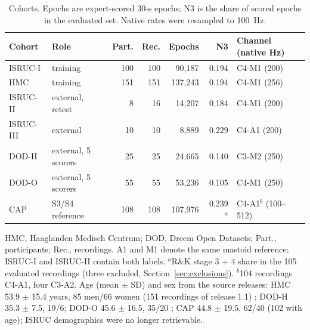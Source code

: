\begin{table}[!t]
\caption{Cohorts. Epochs are expert-scored 30-s epochs; N3 is the share of scored epochs in the evaluated set. Native rates were resampled to 100~Hz.}
\label{tab:cohorts}
\centering
\setlength{\tabcolsep}{3pt}
\footnotesize
\begin{tabular}{@{}llrrrrl@{}}
\toprule
Cohort & Role & Part. & Rec. & Epochs & N3 & Channel (native Hz) \\
\midrule
ISRUC-I & training & 100 & 100 & 90,187 & 0.194 & C4-M1 (200) \\ %
HMC & training & 151 & 151 & 137,243 & 0.194 & C4-M1 (256) \\
ISRUC-II & external, retest & 8 & 16 & 14,207 & 0.184 & C4-M1 (200) \\
ISRUC-III & external & 10 & 10 & 8,889 & 0.229 & C4-A1 (200) \\
DOD-H & external, 5 scorers & 25 & 25 & 24,665 & 0.140 & C3-M2 (250) \\
DOD-O & external, 5 scorers & 55 & 55 & 53,236 & 0.105 & C4-M1 (250) \\
CAP & S3/S4 reference & 108 & 108 & 107,976 & 0.239$^{a}$ & C4-A1$^{b}$ (100--512) \\
\bottomrule
\end{tabular}
\vspace{2pt}

\raggedright\scriptsize HMC, Haaglanden Medisch Centrum; DOD, Dreem Open Datasets; Part., participants; Rec., recordings. A1 and M1 denote the same mastoid reference; ISRUC-I and ISRUC-II contain both labels. $^{a}$R\&K stage 3 + 4 share in the 105 evaluated recordings (three excluded, Section~\ref{sec:exclusions}). $^{b}$104 recordings C4-A1, four C3-A2. Age (mean $\pm$ SD) and sex from the source releases: HMC 53.9 $\pm$ 15.4 years, 85 men/66 women (151 recordings of release 1.1) \cite{alvarez2022hmcdb}; DOD-H 35.3 $\pm$ 7.5, 19/6; DOD-O 45.6 $\pm$ 16.5, 35/20 \cite{guillot2020dod}; CAP 44.8 $\pm$ 19.5, 62/40 (102 with age); ISRUC demographics were no longer retrievable.
\end{table}


